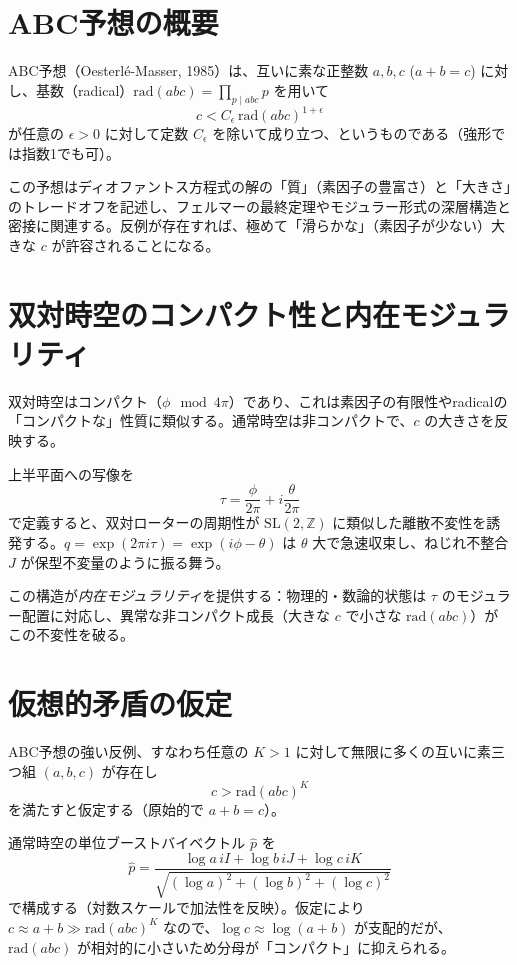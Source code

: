 \documentclass[a4paper]{article}
\begin{document}
\section{ABC予想の概要}

ABC予想（Oesterlé-Masser, 1985）は、互いに素な正整数 $a, b, c$ ($a + b = c$) に対し、基数（radical）$\mathrm{rad}(abc) = \prod_{p \mid abc} p$ を用いて
\[
c < C_\epsilon \, \mathrm{rad}(abc)^{1+\epsilon}
\]
が任意の $\epsilon > 0$ に対して定数 $C_\epsilon$ を除いて成り立つ、というものである（強形では指数1でも可）。

この予想はディオファントス方程式の解の「質」（素因子の豊富さ）と「大きさ」のトレードオフを記述し、フェルマーの最終定理やモジュラー形式の深層構造と密接に関連する。反例が存在すれば、極めて「滑らかな」（素因子が少ない）大きな $c$ が許容されることになる。

\section{双対時空のコンパクト性と内在モジュラリティ}

双対時空はコンパクト（$\phi \mod 4\pi$）であり、これは素因子の有限性やradicalの「コンパクトな」性質に類似する。通常時空は非コンパクトで、$c$ の大きさを反映する。

上半平面への写像を
\[
\tau = \frac{\phi}{2\pi} + i \frac{\theta}{2\pi}
\]
で定義すると、双対ローターの周期性が $\mathrm{SL}(2,\mathbb{Z})$ に類似した離散不変性を誘発する。$q = \exp(2\pi i \tau) = \exp(i \phi - \theta)$ は $\theta$ 大で急速収束し、ねじれ不整合 $J$ が保型不変量のように振る舞う。

この構造が\emph{内在モジュラリティ}を提供する：物理的・数論的状態は $\tau$ のモジュラー配置に対応し、異常な非コンパクト成長（大きな $c$ で小さな $\mathrm{rad}(abc)$）がこの不変性を破る。

\section{仮想的矛盾の仮定}

ABC予想の強い反例、すなわち任意の $K > 1$ に対して無限に多くの互いに素三つ組 $(a,b,c)$ が存在し
\[
c > \mathrm{rad}(abc)^K
\]
を満たすと仮定する（原始的で $a + b = c$）。

通常時空の単位ブーストバイベクトル $\hat{p}$ を
\[
\hat{p} = \frac{\log a \, iI + \log b \, iJ + \log c \, iK}{\sqrt{(\log a)^2 + (\log b)^2 + (\log c)^2}}
\]
で構成する（対数スケールで加法性を反映）。仮定により $c \approx a + b \gg \mathrm{rad}(abc)^K$ なので、$\log c \approx \log(a+b)$ が支配的だが、$\mathrm{rad}(abc)$ が相対的に小さいため分母が「コンパクト」に抑えられる。
\end{document}

